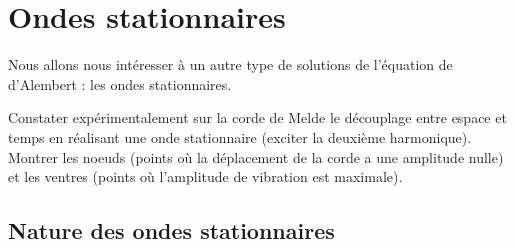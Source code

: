 \documentclass[11pt,a4paper]{report}
\begin{document}
\newpage
\section{Ondes stationnaires}\label{sec:3}

Nous allons nous intéresser à un autre type de solutions de l'équation de d'Alembert : les ondes stationnaires.

Constater expérimentalement sur la corde de Melde le découplage entre espace et temps en réalisant une onde stationnaire (exciter la deuxième harmonique). Montrer les noeuds (points où la déplacement de la corde a une amplitude nulle) et les ventres (points où l'amplitude de vibration est maximale).

\subsection{Nature des ondes stationnaires}

%
\end{document}
